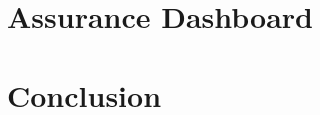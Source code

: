 \documentclass[conference]{IEEEtran}
\begin{document}
\section{Assurance Dashboard}
\label{sec:dashboard}


\section{Conclusion}
\label{sec:conclusion}



%
%
\end{document}
